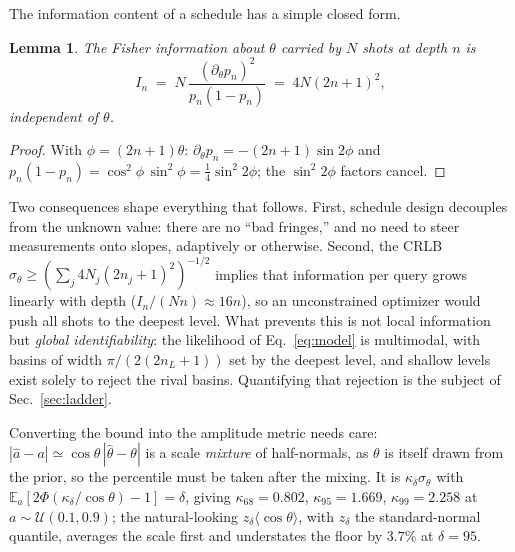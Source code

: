 \documentclass[%
 twocolumn,
 amsmath,amssymb,
prx,
longbibliography
]{revtex4-2}
\newtheorem{lemma}[theorem]{Lemma}
\begin{document}
The information content of a schedule has a simple closed form.

\begin{lemma}\label{lem:fisher}
The Fisher information about $\theta$ carried by $N$ shots at depth $n$ is
\begin{equation}
    I_n \;=\; N\,\frac{(\partial_\theta p_n)^2}{p_n(1-p_n)} \;=\; 4N(2n+1)^2,
\end{equation}
independent of $\theta$.
\end{lemma}

\begin{proof}
With $\phi = (2n+1)\theta$: $\partial_\theta p_n = -(2n+1)\sin 2\phi$ and $p_n(1-p_n) = \cos^2\!\phi\,\sin^2\!\phi = \tfrac14 \sin^2 2\phi$; the $\sin^2 2\phi$ factors cancel.
\end{proof}

Two consequences shape everything that follows. First, schedule design decouples from the unknown value: there are no ``bad fringes,'' and no need to steer measurements onto slopes, adaptively or otherwise. Second, the \ac{CRLB} $\sigma_\theta \ge (\sum_j 4N_j(2n_j+1)^2)^{-1/2}$ implies that information per query grows linearly with depth ($I_n/(Nn) \approx 16n$), so an unconstrained optimizer would push all shots to the deepest level. What prevents this is not local information but \emph{global identifiability}: the likelihood of Eq.~\eqref{eq:model} is multimodal, with basins of width $\pi/(2(2n_L+1))$ set by the deepest level, and shallow levels exist solely to reject the rival basins. Quantifying that rejection is the subject of Sec.~\ref{sec:ladder}.

Converting the bound into the amplitude metric needs care: $|\hat a - a| \simeq \cos\theta\,|\hat\theta - \theta|$ is a scale \emph{mixture} of half-normals, as $\theta$ is itself drawn from the prior, so the percentile must be taken after the mixing. It is $\kappa_\delta \sigma_\theta$ with $\mathbb{E}_a[2\Phi(\kappa_\delta/\cos\theta) - 1] = \delta$, giving $\kappa_{68} = 0.802$, $\kappa_{95} = 1.669$, $\kappa_{99} = 2.258$ at $a \sim \mathcal{U}(0.1, 0.9)$; the natural-looking $z_\delta\langle\cos\theta\rangle$, with $z_\delta$ the standard-normal quantile, averages the scale first and understates the floor by $3.7\%$ at $\delta = 95$.
\end{document}
